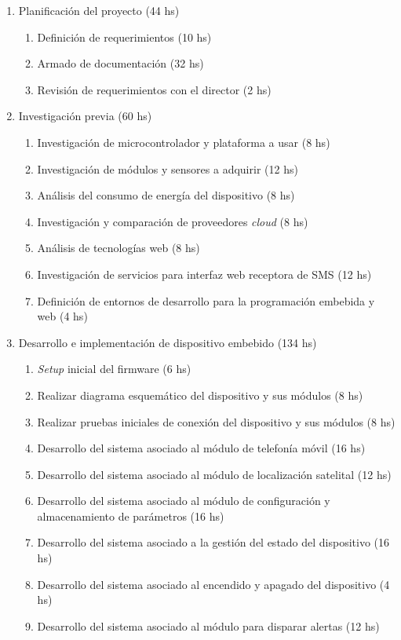 \documentclass[
11pt, %
]{charter}
\begin{document}
\begin{enumerate}
\item Planificación del proyecto (44 hs)
	\begin{enumerate}
	\item Definición de requerimientos (10 hs)
	\item Armado de documentación (32 hs)
	\item Revisión de requerimientos con el director (2 hs)
	\end{enumerate}
\item Investigación previa (60 hs)
	\begin{enumerate}
	\item Investigación de microcontrolador y plataforma a usar (8 hs)
	\item Investigación de módulos y sensores a adquirir (12 hs)
	\item Análisis del consumo de energía del dispositivo (8 hs)
	\item Investigación y comparación de proveedores \textit{cloud} (8 hs)
	\item Análisis de tecnologías web (8 hs)
	\item Investigación de servicios para interfaz web receptora de SMS (12 hs)
	\item Definición de entornos de desarrollo para la programación embebida y web (4 hs)
	\end{enumerate}
\item Desarrollo e implementación de dispositivo embebido (134 hs)
	\begin{enumerate}
	\item \textit{Setup} inicial del firmware (6 hs)
	\item Realizar diagrama esquemático del dispositivo y sus módulos (8 hs)
	\item Realizar pruebas iniciales de conexión del dispositivo y sus módulos (8 hs)
	\item Desarrollo del sistema asociado al módulo de telefonía móvil (16 hs)
	\item Desarrollo del sistema asociado al módulo de localización satelital (12 hs)
	\item Desarrollo del sistema asociado al módulo de configuración y almacenamiento de parámetros (16 hs)
	\item Desarrollo del sistema asociado a la gestión del estado del dispositivo (16 hs)
	\item Desarrollo del sistema asociado al encendido y apagado del dispositivo (4 hs)
	\item Desarrollo del sistema asociado al módulo para disparar alertas (12 hs)

\end{enumerate}
\end{enumerate}
\end{document}
